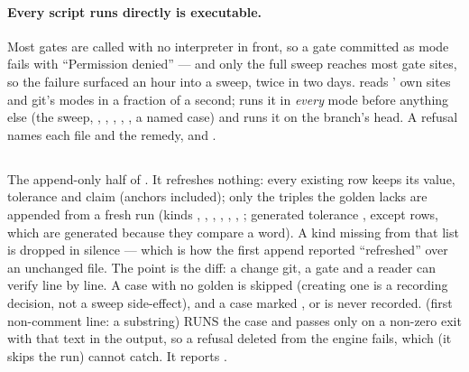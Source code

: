 \documentclass[11pt,a4paper]{article}
\begin{document}
\paragraph{Every script  runs directly is executable.}
Most gates are called with no interpreter in front, so a gate committed as
mode  fails with ``Permission denied'' --- and only the full
sweep reaches most gate sites, so the failure surfaced an hour into a sweep,
twice in two days.   reads
' own sites and git's modes in a fraction of a second;
 runs it in \emph{every} mode before anything else (the
sweep, , , , ,
, a named case) and  runs it on the
branch's head.  A refusal names each file and the remedy,
 and .


\subsection{}\label{sec:record-append}

The append-only half of .  It refreshes nothing: every
existing row keeps its value, tolerance and claim (anchors included);
only the  triples the golden lacks are appended
from a fresh run (kinds , , ,
, , , ;
generated tolerance , except  rows, which are
generated  because they compare a word).  A kind missing
from that list is dropped in silence --- which is how the first
 append reported ``refreshed'' over an unchanged file.  The point is the diff: a change git, a gate and a reader
can verify line by line.  A case with no golden is skipped (creating one
is a recording decision, not a sweep side-effect), and a case marked
,  or  is never
recorded.   (first non-comment line: a substring) RUNS the case and passes only on a non-zero exit with that text in the output, so a refusal deleted from the engine fails, which  (it skips the run) cannot catch.  It reports .
\end{document}
